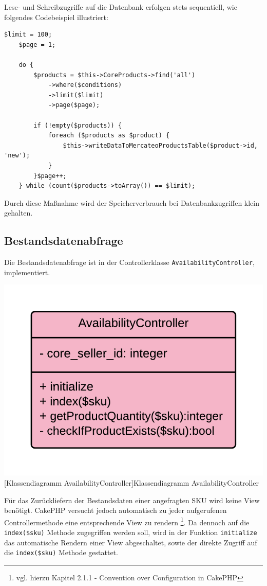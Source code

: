 {	Lese- und Schreibzugriffe auf die Datenbank erfolgen stets sequentiell, wie folgendes Codebeispiel illustriert:
	\lstset{language=php}
	\begin{lstlisting}[caption={Sequentielles Schreiben}]
	$limit = 100;
	$page = 1;
	
	do {
	    $products = $this->CoreProducts->find('all')
	        ->where($conditions)
	        ->limit($limit)
	        ->page($page);
	        
	    if (!empty($products)) {
	        foreach ($products as $product) {        
	            $this->writeDataToMercateoProductsTable($product->id, 'new');
	        }
	    }$page++;
	} while (count($products->toArray()) == $limit);
	\end{lstlisting} 
	Durch diese Maßnahme wird der Speicherverbrauch bei Datenbankzugriffen klein gehalten.
	
	\subsection{Bestandsdatenabfrage}
	
	Die Bestandsdatenabfrage ist in der Controllerklasse \texttt{AvailabilityController}, implementiert.
	
	\begin{minipage}{\linewidth}
		\vspace{1em}
		\centering
		\includegraphics[width=0.4 \linewidth]{img/AvailabilityControllerUML}
		[Klassendiagramm AvailabilityController]{Klassendiagramm AvailabilityController}
		\vspace{1em}
	\end{minipage}
	
	Für das Zurückliefern der Bestandsdaten einer angefragten SKU wird keine View benötigt. CakePHP versucht jedoch automatisch zu jeder aufgerufenen Controllermethode eine entsprechende View zu rendern \footnote{vgl. hierzu Kapitel 2.1.1 - Convention over Configuration in CakePHP}.  Da dennoch auf die \texttt{index(\$sku)} Methode zugegriffen werden soll, wird in der Funktion \texttt{initialize} das automatische Rendern einer View abgeschaltet, sowie der direkte Zugriff auf die \texttt{index(\$sku)} Methode gestattet.
	
}
